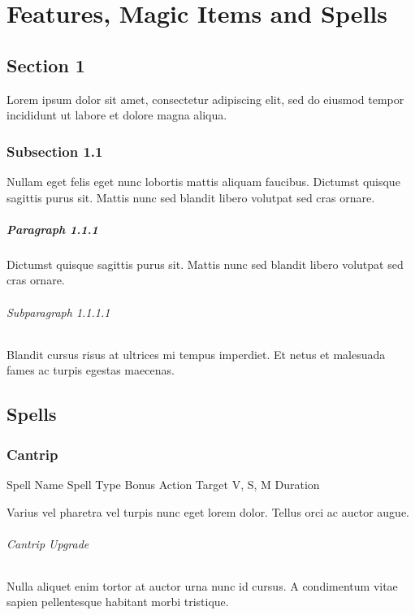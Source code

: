\documentclass[letterpaper,openany,oneside,twocolumn]{book}
\begin{document}
\onecolumn


\rendercharactersheet

\renderbackgroundsheet

\renderspellsheet

\renderoldspellsheet


\restoregeometry
\twocolumn

\chapter*{Features, Magic Items and Spells}

\section*{Section 1}
Lorem ipsum dolor sit amet, consectetur adipiscing elit, sed do eiusmod tempor incididunt ut labore et dolore magna aliqua.
\subsection*{Subsection 1.1}
Nullam eget felis eget nunc lobortis mattis aliquam faucibus. Dictumst quisque sagittis purus sit. Mattis nunc sed blandit libero volutpat sed cras ornare.
\paragraph*{Paragraph 1.1.1}
Dictumst quisque sagittis purus sit. Mattis nunc sed blandit libero volutpat sed cras ornare.
\subparagraph*{Subparagraph 1.1.1.1}
Blandit cursus risus at ultrices mi tempus imperdiet. Et netus et malesuada fames ac turpis egestas maecenas.

\section*{Spells}
\subsection*{Cantrip}

\DndSpellHeader
  {Spell Name}
  {Spell Type}
  {Bonus Action}
  {Target}
  {V, S, M}
  {Duration}

Varius vel pharetra vel turpis nunc eget lorem dolor. Tellus orci ac auctor augue.

\subparagraph*{Cantrip Upgrade} Nulla aliquet enim tortor at auctor urna nunc id cursus. A condimentum vitae sapien pellentesque habitant morbi tristique.
\end{document}
